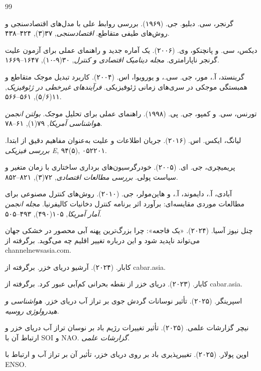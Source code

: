 \documentclass[12pt,a4paper,twocolumn]{article}
\begin{document}
\begin{thebibliography}{99}

گرنجر، سی. دبلیو. جی. (۱۹۶۹). بررسی روابط علی با مدل‌های اقتصادسنجی و روش‌های طیفی متقاطع. \textit{اقتصادسنجی}, ۳۷(۳), ۴۲۴–۴۳۸.

دیکس، سی. و پانچنکو، وی. (۲۰۰۶). یک آماره جدید و راهنمای عملی برای آزمون علیت گرنجر ناپارامتری. \textit{مجله دینامیک اقتصادی و کنترل}, ۳۰(۹-۱۰), ۱۶۴۷–۱۶۶۹.

گرینستد، آ.، مور، جی. سی.، و یورویوا، اس. (۲۰۰۴). کاربرد تبدیل موجک متقاطع و همبستگی موجکی در سری‌های زمانی ژئوفیزیکی. \textit{فرآیندهای غیرخطی در ژئوفیزیک}, ۱۱(۵/۶), ۵۶۱–۵۶۶.

تورنس، سی. و کمپو، جی. پی. (۱۹۹۸). راهنمای عملی برای تحلیل موجک. \textit{بولتن انجمن هواشناسی آمریکا}, ۷۹(۱), ۶۱–۷۸.

لیانگ، ایکس. اس. (۲۰۱۶). جریان اطلاعات و علیت به‌عنوان مفاهیم دقیق از ابتدا. \textit{بررسی فیزیکی E}, ۹۴(۵), ۰۵۲۲۰۱.

پریمیچری، جی. ای. (۲۰۰۵). خودرگرسیون‌های برداری ساختاری با زمان متغیر و سیاست پولی. \textit{بررسی مطالعات اقتصادی}, ۷۲(۳), ۸۲۱–۸۵۲.

آبادی، آ.، دایموند، آ.، و هاین‌مولر، جی. (۲۰۱۰). روش‌های کنترل مصنوعی برای مطالعات موردی مقایسه‌ای: برآورد اثر برنامه کنترل دخانیات کالیفرنیا. \textit{مجله انجمن آمار آمریکا}, ۱۰۵(۴۹۰), ۴۹۳–۵۰۵.

چنل نیوز آسیا. (۲۰۲۴). «یک فاجعه»: چرا بزرگ‌ترین پهنه آبی محصور در خشکی جهان می‌تواند ناپدید شود و این درباره تغییر اقلیم چه می‌گوید. برگرفته از channelnewsasia.com.

کابار. (۲۰۲۴). آرشیو دریای خزر. برگرفته از cabar.asia.

کابار. (۲۰۲۳). دریای خزر از نقطه بحرانی کم‌آبی عبور کرد. برگرفته از cabar.asia.

اسپرینگر. (۲۰۲۵). تأثیر نوسانات گردش جوی بر تراز آب دریای خزر. \textit{هواشناسی و هیدرولوژی روسیه}.

نیچر گزارشات علمی. (۲۰۲۵). تأثیر تغییرات رژیم باد بر نوسان تراز آب دریای خزر و ارتباط آن با SOI و NAO. \textit{گزارشات علمی}.

اوپن پولار. (۲۰۲۵). تغییرپذیری باد بر روی دریای خزر، تأثیر آن بر تراز آب و ارتباط با ENSO.


\end{thebibliography}
\end{document}
